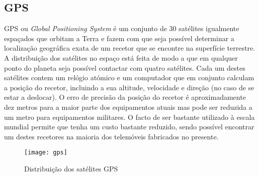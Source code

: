 \subsection{GPS}
\label{subsec: gps}
GPS ou \emph{Global Positioning System} é um conjunto de 30 satélites igualmente espaçados que orbitam a Terra e fazem com que seja possível determinar a localização geográfica exata de um recetor que se encontre na superfície terrestre. A distribuição dos satélites no espaço está feita de modo a que em qualquer ponto do planeta seja possível contactar com quatro satélites. Cada um destes satélites contem um relógio atómico e um computador que em conjunto calculam a posição do recetor, incluindo a sua altitude, velocidade e direção (no caso de se estar a deslocar). O erro de precisão da posição do recetor é aproximadamente dez metros para a maior parte dos equipamentos atuais mas pode ser reduzida a um metro para equipamentos militares. O facto de ser bastante utilizado à escala mundial permite que tenha um custo bastante reduzido, sendo possível encontrar um destes recetores na maioria dos telemóveis fabricados no presente.
\begin{figure}[htbp]
	\centering
	\texttt{[image: gps]}
	\caption{Distribuição dos satélites GPS}
	\label{fig:distribuicao_dos_satelites_gps}
\end{figure}